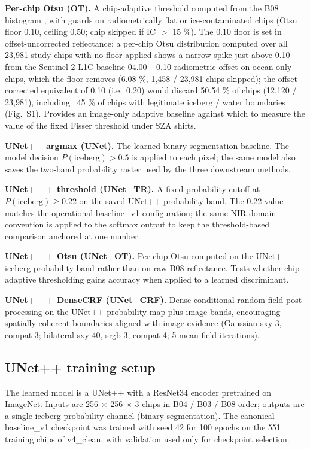 \documentclass[review,jog]{igs}
\begin{document}
\textbf{Per-chip Otsu (OT).} A chip-adaptive threshold computed from the B08 histogram \citep{Otsu1979}, with guards on radiometrically flat or ice-contaminated chips (Otsu floor 0.10, ceiling 0.50; chip skipped if IC $>$ 15 \%). The 0.10 floor is set in offset-uncorrected reflectance: a per-chip Otsu distribution computed over all 23,981 study chips with no floor applied shows a narrow spike just above 0.10 from the Sentinel-2 L1C baseline 04.00 +0.10 radiometric offset on ocean-only chips, which the floor removes (6.08 \%, 1,458 / 23,981 chips skipped); the offset-corrected equivalent of 0.10 (i.e.\ 0.20) would discard 50.54 \% of chips (12,120 / 23,981), including ~45 \% of chips with legitimate iceberg / water boundaries (Fig.~S1). Provides an image-only adaptive baseline against which to measure the value of the fixed Fisser threshold under SZA shifts.

\textbf{UNet++ argmax (UNet).} The learned binary segmentation baseline. The model decision $P(\mathrm{iceberg}) > 0.5$ is applied to each pixel; the same model also saves the two-band probability raster used by the three downstream methods.

\textbf{UNet++ + threshold (UNet\_TR).} A fixed probability cutoff at $P(\mathrm{iceberg}) \geq 0.22$ on the saved UNet++ probability band. The 0.22 value matches the operational baseline\_v1 configuration; the same NIR-domain convention is applied to the softmax output to keep the threshold-based comparison anchored at one number.

\textbf{UNet++ + Otsu (UNet\_OT).} Per-chip Otsu computed on the UNet++ iceberg probability band rather than on raw B08 reflectance. Tests whether chip-adaptive thresholding gains accuracy when applied to a learned discriminant.

\textbf{UNet++ + DenseCRF (UNet\_CRF).} Dense conditional random field post-processing \citep{Krahenbuhl2011} on the UNet++ probability map plus image bands, encouraging spatially coherent boundaries aligned with image evidence (Gaussian sxy 3, compat 3; bilateral sxy 40, srgb 3, compat 4; 5 mean-field iterations).

\subsection{UNet++ training setup}

The learned model is a UNet++ \citep{Zhou2018} with a ResNet34 \citep{He2016} encoder pretrained on ImageNet. Inputs are 256 $\times$ 256 $\times$ 3 chips in B04 / B03 / B08 order; outputs are a single iceberg probability channel (binary segmentation). The canonical baseline\_v1 checkpoint was trained with seed 42 for 100 epochs on the 551 training chips of v4\_clean, with validation used only for checkpoint selection.
\end{document}
